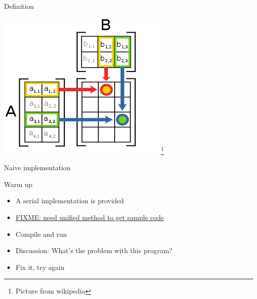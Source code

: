 \documentclass[xcolor=dvipsnames]{beamer}
\begin{document}
	\begin{frame}{Definition}
		\begin{center}
		\includegraphics[scale=0.5]{images/multip}
		\footnote{Picture from wikipedia}
		\end{center}
	\end{frame}



	\begin{frame}{Naive implementation}
		\lstnaive
	\end{frame}


	\begin{frame}{Warm up}
		\begin{itemize}
			\item A serial implementation is provided
			\item \underline{FIXME: need unified method to get sample code}
			\item Compile and run

			\item Discussion: What's the problem with this program?

			\item Fix it, try again
		\end{itemize}
	\end{frame}
	
\end{document}
